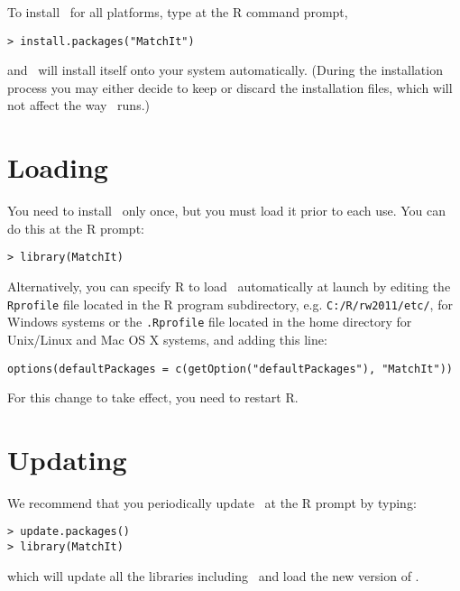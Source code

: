 To install \MatchIt\ for all platforms, type at the R command prompt,
\begin{verbatim}
> install.packages("MatchIt")
\end{verbatim}
and \MatchIt\ will install itself onto your system automatically.
(During the installation process you may either decide to keep or
discard the installation files, which will not affect the way
\MatchIt\ runs.)  

\section{Loading \MatchIt} \label{sec:load}

You need to install \MatchIt\ only once, but you must load it prior to
each use.  You can do this at the R prompt:
\begin{verbatim}
> library(MatchIt)
\end{verbatim}

Alternatively, you can specify R to load \MatchIt\ automatically at
launch by editing the {\tt Rprofile} file located in the R program
subdirectory, e.g.  \texttt{C:/R/rw2011/etc/}, for Windows systems or
the {\tt .Rprofile} file located in the home directory for Unix/Linux
and Mac OS X systems, and adding this line:
\begin{verbatim}
options(defaultPackages = c(getOption("defaultPackages"), "MatchIt"))
\end{verbatim}
For this change to take effect, you need to restart R.

\section{Updating \MatchIt}

We recommend that you periodically update \MatchIt\ at the R prompt by typing:
\begin{verbatim}
> update.packages()
> library(MatchIt)
\end{verbatim}
which will update all the libraries including \MatchIt\ and load the
new version of \MatchIt.


